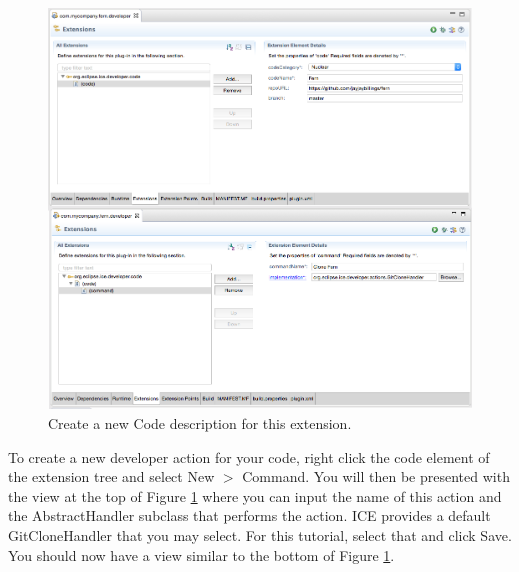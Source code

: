 \begin{figure}[h]
\includegraphics[width=\textwidth]{figures/comb.png}
\caption{Create a new Code description for this extension.}
\label{fig:config2}
\end{figure}

To create a new developer action for your code, right click the code element of
the extension tree and select New $>$ Command. You will then be presented
with the view at the top of Figure \ref{fig:config2} where you can input the
name of this action and the AbstractHandler subclass that performs the action.
ICE provides a default GitCloneHandler that you may select. For this tutorial,
select that and click Save. You should now have a view similar to the bottom of
Figure \ref{fig:config2}.


